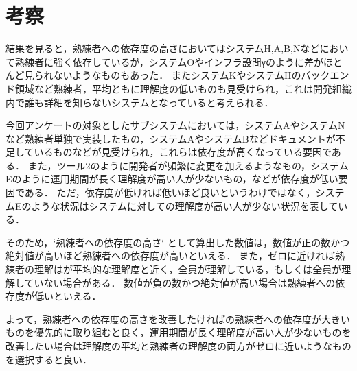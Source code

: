 \section{考察}
結果を見ると，熟練者への依存度の高さにおいてはシステムH,A,B,Nなどにおいて熟練者に強く依存しているが，システムOやインフラ設問γのように差がほとんど見られないようなものもあった．
またシステムKやシステムHのバックエンド領域など熟練者，平均ともに理解度の低いものも見受けられ，これは開発組織内で誰も詳細を知らないシステムとなっていると考えられる．

今回アンケートの対象としたサブシステムにおいては，システムAやシステムNなど熟練者単独で実装したもの，システムAやシステムBなどドキュメントが不足しているものなどが見受けられ，これらは依存度が高くなっている要因である．
また，ツール2のように開発者が頻繁に変更を加えるようなもの，システムEのように運用期間が長く理解度が高い人が少ないもの，などが依存度が低い要因である．
ただ，依存度が低ければ低いほど良いというわけではなく，システムEのような状況はシステムに対しての理解度が高い人が少ない状況を表している．

そのため，`熟練者への依存度の高さ` として算出した数値は，数値が正の数かつ絶対値が高いほど熟練者への依存度が高いといえる．
また，ゼロに近ければ熟練者の理解はが平均的な理解度と近く，全員が理解している，もしくは全員が理解していない場合がある．
数値が負の数かつ絶対値が高い場合は熟練者への依存度が低いといえる．

よって，熟練者への依存度の高さを改善したければの熟練者への依存度が大きいものを優先的に取り組むと良く，運用期間が長く理解度が高い人が少ないものを改善したい場合は理解度の平均と熟練者の理解度の両方がゼロに近いようなものを選択すると良い．
